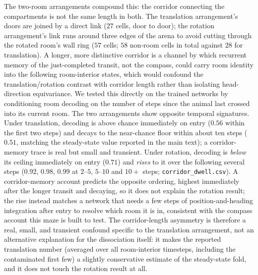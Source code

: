 The two-room arrangements compound this: the corridor connecting the compartments is not the same
length in both. The translation arrangement's doors are joined by a direct link ($27$ cells,
door to door); the rotation arrangement's link runs around three edges of the arena to avoid
cutting through the rotated room's wall ring ($57$ cells; $58$ non-room cells in total against
$28$ for translation). A longer, more distinctive corridor is a channel by which recurrent memory
of the just-completed transit, not the compass, could carry room identity into the following
room-interior states, which would confound the translation/rotation contrast with corridor length
rather than isolating head-direction equivariance. We tested this directly on the trained networks
by conditioning room decoding on the number of steps since the animal last crossed into its current
room. The two arrangements show opposite temporal signatures. Under translation, decoding is
above chance immediately on entry ($0.56$ within the first two steps) and decays to the
near-chance floor within about ten steps ($0.51$, matching the steady-state value reported in the
main text); a corridor-memory trace is real but small and transient. Under rotation, decoding is
\emph{below} its ceiling immediately on entry ($0.71$) and \emph{rises} to it over the following
several steps ($0.92$, $0.98$, $0.99$ at $2$--$5$, $5$--$10$ and $10+$ steps; \texttt{corridor\_dwell.csv}).
A corridor-memory account predicts the opposite ordering, highest immediately after the longer
transit and decaying, so it does not explain the rotation result; the rise instead matches a
network that needs a few steps of position-and-heading integration after entry to resolve which
room it is in, consistent with the compass account this maze is built to test. The corridor-length
asymmetry is therefore a real, small, and transient confound specific to the translation
arrangement, not an alternative explanation for the dissociation itself: it makes the reported
translation number (averaged over all room-interior timesteps, including the contaminated first
few) a slightly conservative estimate of the steady-state fold, and it does not touch the rotation
result at all.

